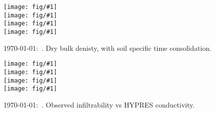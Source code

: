 \documentclass[a4paper]{article}
\newcommand{\figright}[1]{\texttt{[image: fig/\#1]}}
\newcommand{\figctop}[1]{\hspace*{-1cm}\figright{#1}}
\newcommand{\figc}[1]{\vspace*{-1.6cm}\figctop{#1}}
\newcommand{\MyID}{\today:~}
\begin{document}
\pagestyle{empty}

\begin{figure}[htbp]
  \begin{center}
    \figctop{rho_b_L1} \\
    \figc{rho_b_L2} \\
    \figc{rho_b_L3} \\
    \figc{rho_b_L4}
  \end{center}
  \caption{\MyID{}. Dry bulk denisty, with soil specific time consolidation.}
  \label{fig:rho_b_original}
\end{figure}

\begin{figure}[htbp]
  \begin{center}
    \figctop{K_L1} \\
    \figc{K_L2} \\
    \figc{K_L3} \\
    \figc{K_L4}
  \end{center}
  \caption{\MyID{}. Observed infiltrability vs HYPRES conductivity.}
  \label{fig:K_original}
\end{figure}
\end{document}
